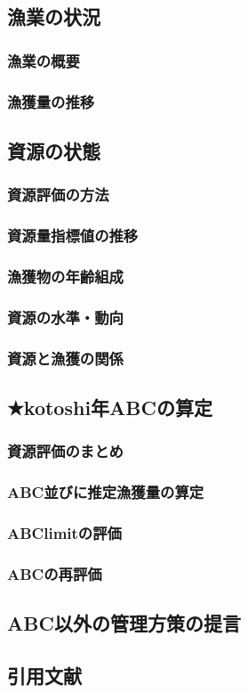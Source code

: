 \subsection{漁業の状況}
\subsubsection{漁業の概要}
\subsubsection{漁獲量の推移}

\subsection{資源の状態}
\subsubsection{資源評価の方法}
\subsubsection{資源量指標値の推移}
\subsubsection{漁獲物の年齢組成}
\subsubsection{資源の水準・動向}
\subsubsection{資源と漁獲の関係}

\subsection{★kotoshi年ABCの算定}
\subsubsection{資源評価のまとめ}
\subsubsection{ABC並びに推定漁獲量の算定}
\subsubsection{ABClimitの評価}
\subsubsection{ABCの再評価}

\subsection{ABC以外の管理方策の提言}
\subsection{引用文献}
